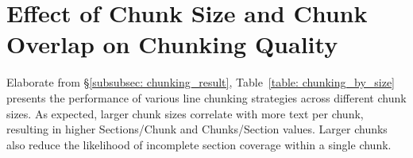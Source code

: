 \appendix

\section{Effect of Chunk Size and Chunk Overlap on Chunking Quality}
\label{appendix: chunk_hyper}

Elaborate from \S\ref{subsubsec: chunking_result}, Table~\ref{table: chunking_by_size} presents the performance of various line chunking strategies across different chunk sizes. As expected, larger chunk sizes correlate with more text per chunk, resulting in higher Sections/Chunk and Chunks/Section values. Larger chunks also reduce the likelihood of incomplete section coverage within a single chunk.

